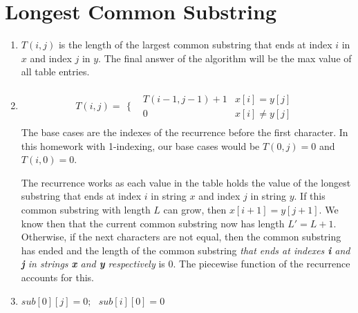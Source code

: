 \documentclass{article}
\begin{document}
\newpage
\section{Longest Common Substring}
\begin{enumerate}
    \item $T(i, j)$ is the length of the largest common substring that ends at index $i$ in $x$ and index $j$ in $y$.
            The final answer of the algorithm will be the max value of all table entries.
    \item 
        \begin{align*}
            T(i, j) = 
            \begin{array}{cc}
                \Bigg\{ & 
                \begin{array}{cc}
                    T(i-1, j-1) + 1 & x[i] = y[j] \\
                    0 & x[i] \neq y[j] 
                \end{array}
            \end{array}
        \end{align*}
        The base cases are the indexes of the recurrence before the first character. In this homework with 1-indexing, our base cases would be $T(0, j) = 0$ and $T(i, 0) = 0$.
        
        The recurrence works as each value in the table holds the value of the longest substring that ends at index $i$ in string $x$ and index $j$ in string $y$. If this common substring with length $L$ can grow,
        then $x[i+1] = y[j+1]$. We know then that the current common substring now has length $L' = L+1$. Otherwise, if the next characters are not equal, then the common substring has ended and the length
        of the common substring \emph{that ends at indexes \textbf{i} and \textbf{j} in strings \textbf{x} and \textbf{y} respectively} is $0$. The piecewise function of the recurrence accounts for this.
    \item 
        \begin{algorithmic}
                    \State $sub[0][j] = 0; \text{ } sub[i][0] = 0$
                \EndFor


\end{algorithmic}
\end{enumerate}
\end{document}
